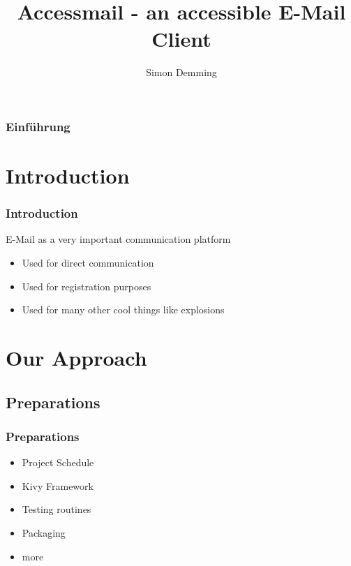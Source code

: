 \documentclass[9pt]{beamer}
\title{Accessmail - an accessible E-Mail Client}
\author{Simon Demming}
\institute[Department]{\par\smallskip\smallskip Department for Rehabilitation\\ Department for Computer Science}
\begin{document}
	\begin{frame}
		\setcounter{framenumber}{0}
	    \titlepage
	\end{frame}
	
	\begin{frame}
	    \frametitle{Einführung}
	    \tableofcontents
	\end{frame}
	
	\section{Introduction}
		\begin{frame}
			\frametitle{Introduction}
			
			E-Mail as a very important communication platform
			\begin{itemize}
				\item Used for direct communication
				\item Used for registration purposes
				\item Used for many other cool things like explosions
			\end{itemize}
		
		\end{frame}
	
	
	
	
	\section{Our Approach}
		\subsection{Preparations}
		
			\begin{frame}
				\frametitle{Preparations}
				\begin{itemize}
					\item Project Schedule
					\item Kivy Framework
					\item Testing routines
					\item Packaging
					\item more
				\end{itemize}
			\end{frame}
			
\end{document}
